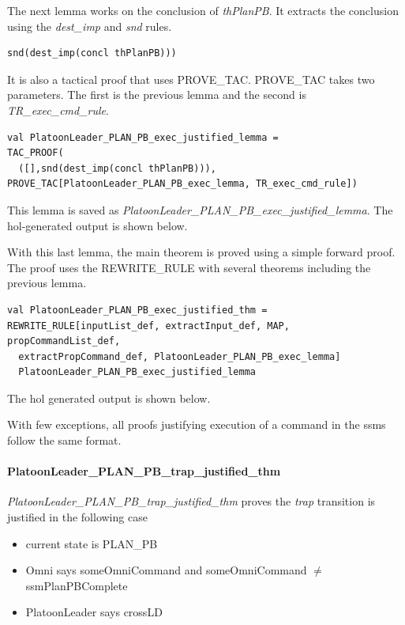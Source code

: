 \documentclass[../../main/main.tex]{subfiles}
\begin{document}
The next lemma works on the conclusion of \textit{thPlanPB}.  It extracts the conclusion using the \textit{dest_imp} and \textit{snd} rules. 

\begin{lstlisting}
snd(dest_imp(concl thPlanPB)))
\end{lstlisting}

 It is also a tactical proof that uses PROVE_TAC.  PROVE_TAC takes two parameters. The first is the previous lemma and the second is \textit{TR_exec_cmd_rule}.  

\begin{lstlisting}
val PlatoonLeader_PLAN_PB_exec_justified_lemma =
TAC_PROOF(
  ([],snd(dest_imp(concl thPlanPB))),
PROVE_TAC[PlatoonLeader_PLAN_PB_exec_lemma, TR_exec_cmd_rule])
\end{lstlisting}

This lemma is saved as \textit{PlatoonLeader_PLAN_PB_exec_justified_lemma}.  The \gls{hol}-generated output is shown below.

\HOLssmPBIntegratedTheoremsPlatoonLeaderXXPLANXXPBXXexecXXjustifiedXXlemma


With this last lemma, the main theorem is proved using a simple forward proof.  The proof uses the REWRITE_RULE with several theorems including the previous lemma. 

\begin{lstlisting}
val PlatoonLeader_PLAN_PB_exec_justified_thm =
REWRITE_RULE[inputList_def, extractInput_def, MAP, propCommandList_def,
  extractPropCommand_def, PlatoonLeader_PLAN_PB_exec_lemma]
  PlatoonLeader_PLAN_PB_exec_justified_lemma
\end{lstlisting}

The \gls{hol} generated output is shown below.
\HOLssmPBIntegratedTheoremsPlatoonLeaderXXPLANXXPBXXexecXXjustifiedXXthm

With few exceptions, all proofs justifying execution of a command in the \glspl{ssm} follow the same format.

\paragraph*{PlatoonLeader_PLAN_PB_trap_justified_thm}
\textit{PlatoonLeader_PLAN_PB_trap_justified_thm} proves the \textit{trap} transition is justified in the following case
\begin{itemize}
\item current state is PLAN_PB
\item Omni says someOmniCommand and someOmniCommand $\neq$ ssmPlanPBComplete
\item PlatoonLeader says crossLD
\end{itemize}
\end{document}
